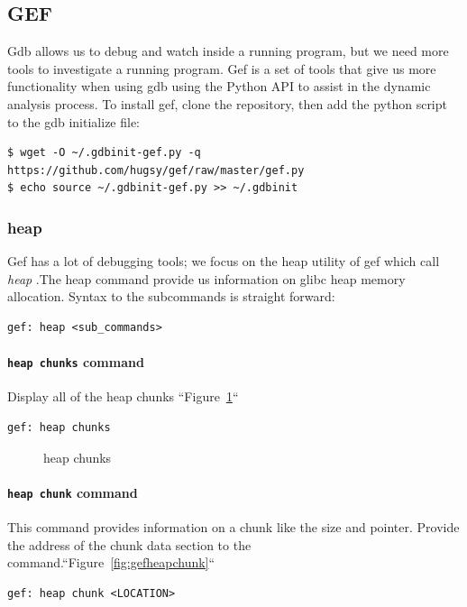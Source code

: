 \documentclass{masterthesis}
\newcommand*\libc{glibc}
\begin{document}
\subsection{GEF}
Gdb allows us to debug and watch inside a running program, but we need more tools to investigate a running program. Gef is a set of tools that give us more functionality when using gdb using the Python API to assist in the dynamic analysis process. To install gef, clone the repository, then add the python script to the gdb initialize file:
\begin{lstlisting}[frame=tlrb]
$ wget -O ~/.gdbinit-gef.py -q https://github.com/hugsy/gef/raw/master/gef.py
$ echo source ~/.gdbinit-gef.py >> ~/.gdbinit
\end{lstlisting}

\subsubsection{heap}
Gef has a lot of debugging tools; we focus on the heap utility of gef which call \emph{heap} .The heap command provide us information on \libc{} heap memory allocation. Syntax to the subcommands is straight forward:
\begin{lstlisting}[frame=tlrb]
gef: heap <sub_commands>
\end{lstlisting}

\paragraph{\lstinline{heap chunks} command}

Display all of the heap chunks  ``Figure~\ref{fig:gefheapchunks}``
\begin{lstlisting}[frame=tlrb]
gef: heap chunks
\end{lstlisting}

\begin{figure}[h!]
\caption{heap chunks}
\label{fig:gefheapchunks}
\end{figure}

\paragraph{\lstinline{heap chunk} command}
This command provides information on a chunk like the size and pointer. Provide the address of the chunk data section to the command.``Figure~\ref{fig:gefheapchunk}``
\begin{lstlisting}[frame=tlrb]
gef: heap chunk <LOCATION>
\end{lstlisting}
\end{document}

